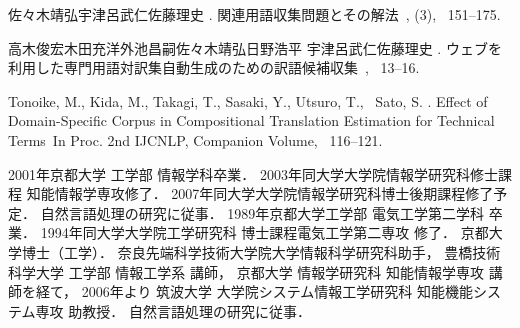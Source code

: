 \documentclass[japanese]{jnlp_1.3a}
\begin{document}
\begin{thebibliography}{}
佐々木靖弘\JBA 宇津呂武仁\JBA 佐藤理史 \BBCP.
\newblock \JBOQ 関連用語収集問題とその解法\JBCQ\
\newblock {}, {}  (3), \mbox{\BPGS\ 151--175}.

高木俊宏\JBA 木田充洋\JBA 外池昌嗣\JBA 佐々木靖弘\JBA 日野浩平\JBA
  宇津呂武仁\JBA 佐藤理史 \BBCP.
\newblock \JBOQ
  ウェブを利用した専門用語対訳集自動生成のための訳語候補収集\JBCQ\
\newblock {}, \mbox{\BPGS\ 13--16}.

Tonoike, M., Kida, M., Takagi, T., Sasaki, Y., Utsuro, T., \BBA\ Sato, S. \BBOP
  2005\BBCP.
\newblock \BBOQ Effect of Domain-Specific Corpus in Compositional Translation
  Estimation for Technical Terms\BBCQ\
\newblock In {\Bem Proc. 2nd IJCNLP, Companion Volume}, \mbox{\BPGS\ 116--121}.

\end{thebibliography}


\begin{biography}
{2001年京都大学 工学部 情報学科卒業．
2003年同大学大学院情報学研究科修士課程 知能情報学専攻修了．
2007年同大学大学院情報学研究科博士後期課程修了予定．
自然言語処理の研究に従事．
}
\bioauthor{宇津呂武仁}
{
1989年京都大学工学部 電気工学第二学科 卒業．
1994年同大学大学院工学研究科 博士課程電気工学第二専攻 修了．
京都大学博士（工学）．
奈良先端科学技術大学院大学情報科学研究科助手，
豊橋技術科学大学 工学部 情報工学系 講師，
京都大学 情報学研究科 知能情報学専攻 講師を経て，
2006年より
筑波大学 大学院システム情報工学研究科 知能機能システム専攻 助教授．
自然言語処理の研究に従事．
}

\end{biography}







\biodate
\end{document}
